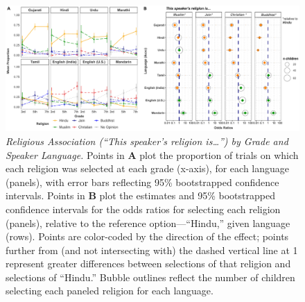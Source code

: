 \documentclass{foushee-adapted-preprint}
\begin{document}
\begin{figure}
    \centering
    \includegraphics[width=\linewidth]{figures/combined_plots/combined_rel_finalized.pdf}
    \caption{\textit{Religious Association (``This speaker's religion is\ldots'') by Grade and Speaker Language.} 
    Points in \textbf{A} plot the proportion of trials on which each religion was selected at each grade (x-axis), for each language (panels), with error bars reflecting 95\% bootstrapped confidence intervals. 
    Points in \textbf{B} plot the estimates and 95\% bootstrapped confidence intervals for the odds ratios for selecting each religion (panels), relative to the reference option---``Hindu,'' given language (rows). 
    Points are color-coded by the direction of the effect; points further from (and not intersecting with) the dashed vertical line at 1 represent greater differences between selections of that religion and selections of ``Hindu.'' 
    Bubble outlines reflect the number of children selecting each paneled religion for each language.} %
    \label{fig:religion}
\end{figure}
\end{document}
